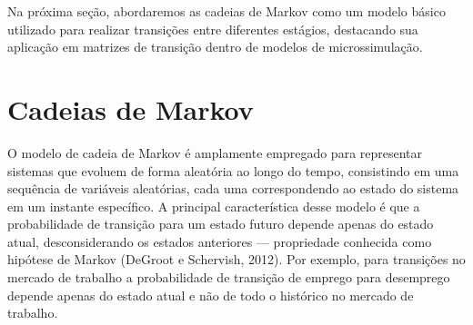 \documentclass[12pt, a4paper, openany]{book}
\numberwithin{equation}{chapter}
\numberwithin{table}{chapter}
\numberwithin{figure}{chapter}
\theoremstyle{break}
\begin{document}
Na próxima seção, abordaremos as cadeias de Markov como um modelo básico utilizado para realizar transições entre diferentes estágios, destacando sua aplicação em matrizes de transição dentro de modelos de microssimulação.














\section[Cadeias de Markov]{Cadeias de Markov\protect\footnotemark}


O modelo de cadeia de Markov é amplamente empregado para representar sistemas que evoluem de forma aleatória ao longo do tempo, consistindo em uma sequência de variáveis aleatórias, cada uma correspondendo ao estado do sistema em um instante específico. A principal característica desse modelo é que a probabilidade de transição para um estado futuro depende apenas do estado atual, desconsiderando os estados anteriores — propriedade conhecida como hipótese de Markov (DeGroot e Schervish, 2012). Por exemplo, para transições no mercado de trabalho a probabilidade de transição de emprego para desemprego depende apenas do estado atual e não de todo o histórico no mercado de trabalho.
\end{document}
